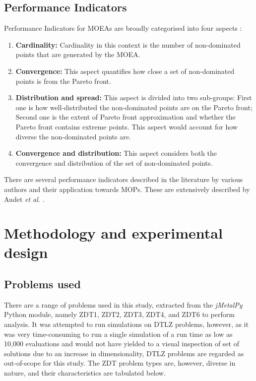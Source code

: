 \documentclass[sigconf, nonacm, preprint]{acmart}
\begin{document}
\subsection{Performance Indicators} \label{sec:Background_PI}
Performance Indicators for MOEAs are broadly categorised into four aspects \cite{audet2021}:
\begin{enumerate}
\item\textbf{Cardinality:} Cardinality in this context is the number of non-dominated points that are generated by the MOEA.
\item\textbf{Convergence:} This aspect quantifies how close a set of non-dominated points is from the Pareto front.
\item\textbf{Distribution and spread:} This aspect is divided into two sub-groups: First one is how well-distributed the non-dominated points are on the Pareto front; Second one is the extent of Pareto front approximation and whether the Pareto front contains extreme points. This aspect would account for how diverse the non-dominated points are.
\item\textbf{Convergence and distribution:} This aspect considers both the convergence and distribution of the set of non-dominated points.
\end{enumerate}
There are several performance indicators described in the literature by various authors and their application towards MOPs. These are extensively described by Audet \textit{et al.} \cite{audet2021}.\\

\section{Methodology and experimental design}
\subsection{Problems used}
There are a range of problems used in this study, extracted from the \textit{jMetalPy} \cite{jmetalpy2019} Python module, namely ZDT1, ZDT2, ZDT3, ZDT4, and ZDT6 to perform analysis. It was attempted to run simulations on DTLZ problems, however, as it was very time-consuming to run a single simulation of a run time as low as 10,000 evaluations and would not have yielded to a visual inspection of set of solutions due to an increase in dimensionality, DTLZ problems are regarded as out-of-scope for this study. The ZDT problem types are, however, diverse in nature, and their characteristics are tabulated below.\\
\end{document}

